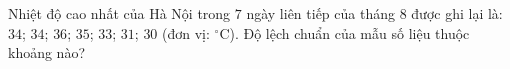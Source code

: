 \begin{ex}
Nhiệt độ cao nhất của Hà Nội trong $7$ ngày liên tiếp của tháng 8 được ghi lại là: $34$; $34$; $36$; $35$; $33$; $31$; $30$ (đơn vị: $^\circ$C). Độ lệch chuẩn của mẫu số liệu thuộc khoảng nào?
\end{ex}
